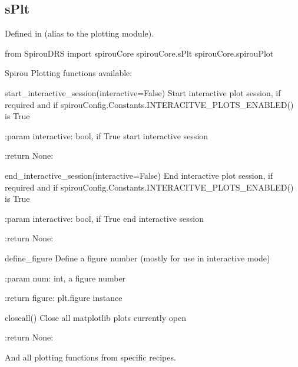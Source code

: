 \noindent\begin{minipage}{\textwidth}
\subsection{sPlt}

Defined in \spirouCore{} (alias to the plotting module).

\begin{pythonbox}
from SpirouDRS import spirouCore
spirouCore.sPlt
spirouCore.spirouPlot
\end{pythonbox}

\begin{pythondocstring}
Spirou Plotting functions available:

start_interactive_session(interactive=False)
    Start interactive plot session, if required and if
    spirouConfig.Constants.INTERACITVE_PLOTS_ENABLED() is True

    :param interactive: bool, if True start interactive session

    :return None:

end_interactive_session(interactive=False)
    End interactive plot session, if required and if
    spirouConfig.Constants.INTERACITVE_PLOTS_ENABLED() is True

    :param interactive: bool, if True end interactive session

    :return None:


define_figure
    Define a figure number (mostly for use in interactive mode)

    :param num: int, a figure number

    :return figure: plt.figure instance

closeall()
    Close all matplotlib plots currently open

    :return None:

And all plotting functions from specific recipes.
\end{pythondocstring}
\end{minipage}


